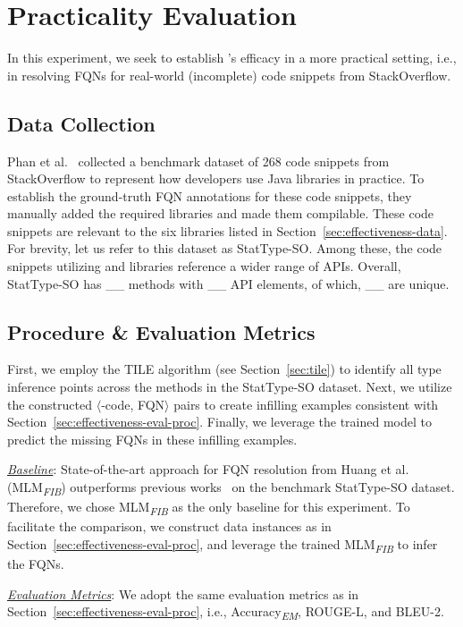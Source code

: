 \section{Practicality Evaluation}
\label{sec:eval}

In this experiment, we seek to establish \tool's efficacy in a more practical setting, i.e., in resolving FQNs for real-world (incomplete) code snippets from StackOverflow.

\subsection{Data Collection}
Phan et al.~\cite{icse18} collected a benchmark dataset of 268 code snippets from StackOverflow to represent how developers use Java libraries in practice. To establish the ground-truth FQN annotations for these code snippets, they manually added the required libraries and made them compilable. These code snippets are relevant to the six libraries listed in Section~\ref{sec:effectiveness-data}. For brevity, let us refer to this dataset as StatType-SO. Among these, the code snippets utilizing  and  libraries reference a wider range of APIs. Overall, StatType-SO has \_\_ methods with \_\_ API elements, of which, \_\_ are unique.

\subsection{Procedure \& Evaluation Metrics}
First, we employ the TILE algorithm (see Section~\ref{sec:tile}) to identify all type inference points across the methods in the StatType-SO dataset. Next, we utilize the constructed $\langle$\blank-code, FQN$\rangle$ pairs to create infilling examples consistent with Section~\ref{sec:effectiveness-eval-proc}. Finally, we leverage the trained \tool model to predict the missing FQNs in these infilling examples.

\underline{\textit{Baseline}}: State-of-the-art approach for FQN resolution from Huang et al.~\cite{prompt-ase22} (MLM\textsubscript{\textit{FIB}}) outperforms previous works~\cite{coster-ase19, snr-icse22} on the benchmark StatType-SO dataset. Therefore, we chose MLM\textsubscript{\textit{FIB}} as the only baseline for this experiment. To facilitate the comparison, we construct data instances as in Section~\ref{sec:effectiveness-eval-proc}, and leverage the trained MLM\textsubscript{\textit{FIB}} to infer the FQNs.

\underline{\textit{Evaluation Metrics}}: We adopt the same evaluation metrics as in Section~\ref{sec:effectiveness-eval-proc}, i.e., Accuracy\textsubscript{\textit{EM}}, ROUGE-L, and BLEU-2.

